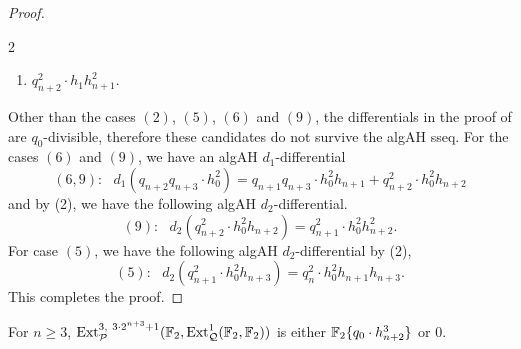\begin{proof}
\begin{multicols}{2}
\begin{enumerate}
\item $q_{n+2}^2 \cdot h_1h_{n+1}^2$.
\end{enumerate}
\end{multicols}
Other than the cases $(2)$, $(5)$, $(6)$ and $(9)$, the differentials in the proof of  are $q_0$-divisible, therefore these candidates do not survive the algAH sseq. 
For the cases $(6)$ and $(9)$, we have an algAH $d_1$-differential
\[ (6,9): \ \ \ d_1(q_{n+2}q_{n+3} \cdot h_0^2) = q_{n+1}q_{n+3} \cdot h_0^2h_{n+1} + q_{n+2}^2 \cdot h_0^2h_{n+2} \]
and by (2), we have the following algAH $d_2$-differential.
$$(9): \ \ \ d_2(q_{n+2}^2 \cdot h_0^2h_{n+2})  = q_{n+1}^2 \cdot h_0^2h_{n+2}^2.$$
For case $(5)$, we have the following algAH $d_2$-differential by (2),
\[ (5): \ \ \ d_2(q_{n+1}^2 \cdot h_0^2h_{n+3}) = q_{n}^2 \cdot h_0^2h_{n+1}h_{n+3}. \]
This completes the proof.
\end{proof}

\begin{lem} \label{lem:q01hj3}
  For $n\geq 3$, $\operatorname{\mathrm{Ext}}^{3,\ 3\cdot 2^{n+3} + 1}_{\mathcal{P}}(\operatorname{\mathbb{F}}_2, \operatorname{\mathrm{Ext}}_{\mathcal{Q}}^1(\operatorname{\mathbb{F}}_2, \operatorname{\mathbb{F}}_2))$ is either $\operatorname{\mathbb{F}}_2\{q_0 \cdot h_{n+2}^3\}$ or $0$.
\end{lem} 


